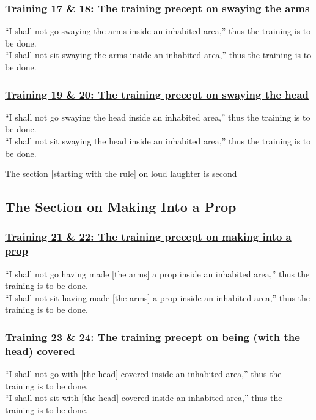 \subsubsection*{\hyperref[sekh17-18]{Training 17 \& 18: The training precept on swaying the arms}}
\label{training17-18}
``I shall not go swaying the arms inside an inhabited area,'' thus the training is to be done.\\
``I shall not sit swaying the arms inside an inhabited area,'' thus the training is to be done.

\subsubsection*{\hyperref[sekh19-20]{Training 19 \& 20: The training precept on swaying the head}}
\label{training19-20}
``I shall not go swaying the head inside an inhabited area,'' thus the training is to be done.\\
``I shall not sit swaying the head inside an inhabited area,'' thus the training is to be done.

\begin{center}
  The section [starting with the rule] on loud laughter is second
\end{center}

\setsubsecheadstyle{\subsectionFmt}
\subsection{The Section on Making Into a Prop}
\vspace{0.2cm}

\subsubsection*{\hyperref[sekh21-22]{Training 21 \& 22: The training precept on making into a prop}}
\label{training21-22}
``I shall not go having made [the arms] a prop inside an inhabited area,'' thus the training is to be done.\\
``I shall not sit having made [the arms] a prop inside an inhabited area,'' thus the training is to be done.

\subsubsection*{\hyperref[sekh23-24]{Training 23 \& 24: The training precept on being (with the head) covered}}
\label{training23-24}
``I shall not go with [the head] covered inside an inhabited area,'' thus the training is to be done.\\
``I shall not sit with [the head] covered inside an inhabited area,'' thus the training is to be done.

